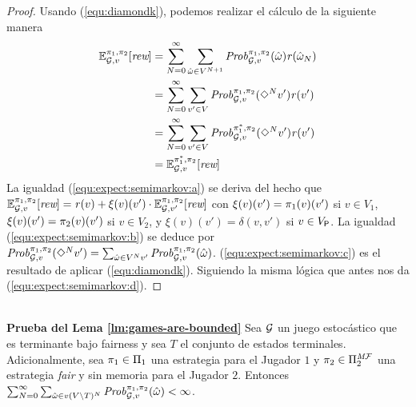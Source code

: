 \begin{proof}
  Usando (\ref{equ:diamondk}), podemos realizar el cálculo de la siguiente manera
  \begin{align}
  \mathbb{E}^{\pi_{1}, \pi_{2}}_{\mathcal{G},v}[\textit{rew}]   &  = \sum^\infty_{N=0} \sum_{\hat{\omega} \in V^{N+1}} \mathit{Prob}^{\pi_{1}, \pi_{2}}_{\mathcal{G},v}(\hat{\omega})\mathit{r}(\hat{\omega}_N) \label{equ:expect:semimarkov:a}\\
  & = \sum^\infty_{N=0} \sum_{v' \in V} \mathit{Prob}^{\pi_{1}, \pi_{2}}_{\mathcal{G},v}(\Diamond^N v')\mathit{r}(v') \label{equ:expect:semimarkov:b}\\
  & =  \sum^\infty_{N=0} \sum_{v' \in V} \mathit{Prob}^{\pi^*_{1}, \pi_{2}}_{\mathcal{G},v}(\Diamond^N v')\mathit{r}(v') \label{equ:expect:semimarkov:c}\\
  &  = \mathbb{E}^{\pi^*_{1}, \pi_{2}}_{\mathcal{G},v}[\textit{rew}] \label{equ:expect:semimarkov:d}
  \end{align}
  La igualdad (\ref{equ:expect:semimarkov:a}) se deriva del hecho que 
  $\mathbb{E}^{\pi_{1}, \pi_{2}}_{\mathcal{G},v}[\textit{rew}]= \mathit{r}(v) + \xi(v)(v') \cdot \mathbb{E}^{\pi_{1}, \pi_{2}}_{\mathcal{G},v'}[\textit{rew}]$
  con $\xi(v)(v')=\pi_{1}(v)(v')$ si $v\in V_1$,
  $\xi(v)(v')=\pi_{2}(v)(v')$ si $v\in V_2$, y $\xi(v)(v')=\delta(v,v')$
  si $v\in V_{\mathsf{P}}$.
  La igualdad (\ref{equ:expect:semimarkov:b}) se deduce por
  $\mathit{Prob}^{\pi_{1}, \pi_{2}}_{\mathcal{G},v}(\Diamond^N v')=\sum_{\hat{\omega} \in V^{N}v'} \mathit{Prob}^{\pi_{1}, \pi_{2}}_{\mathcal{G},v}(\hat{\omega})$.
  (\ref{equ:expect:semimarkov:c}) es el resultado de aplicar
  (\ref{equ:diamondk}).
  Siguiendo la misma lógica que antes nos da (\ref{equ:expect:semimarkov:d}).
\qedhere
\end{proof} \\ 

















\noindent
\textbf{Prueba del Lema \ref{lm:games-are-bounded}}
  Sea $\mathcal{G}$ un juego estocástico que es terminante bajo fairness
  y sea $T$ el conjunto de estados terminales. Adicionalmente, sea
  $\pi_{1} \in \Pi_{1}$ una estrategia para el Jugador $1$ y
  $\pi_{2} \in \Pi^{\textit{M}\mathcal{F}}_{2}$ una estrategia \emph{fair} y sin memoria para el Jugador $2$.  Entonces
  $\sum^\infty_{N=0} \sum_{\hat{\omega} \in v(V \setminus T)^N} \mathit{Prob}^{\pi_{1}, \pi_{2}}_{\mathcal{G},v}(\hat{\omega}) < \infty$.
\noindent \\

